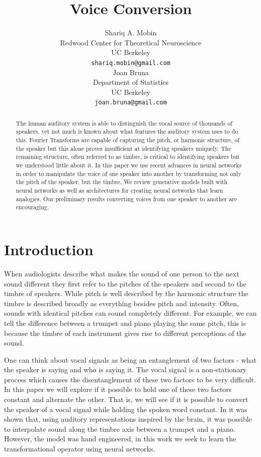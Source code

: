 \documentclass{article}
\title{Voice Conversion}
\author{
  Shariq A. Mobin \\
  Redwood Center for Theoretical Neuroscience \\
  UC Berkeley \\
  \texttt{shariq.mobin@gmail.com} \\
  \And
  Joan Bruna \\
  Department of Statistics \\
  UC Berkeley \\
  \texttt{joan.bruna@gmail.com}
}
\begin{document}

\maketitle

\begin{abstract}
    The human auditory system is able to distinguish the vocal source of thousands of speakers, yet not much is known about what features the auditory system uses to do this. Fourier Transforms are capable of capturing the pitch, or harmonic structure, of the speaker but this alone proves insufficient at identifying speakers uniquely. The remaining structure, often referred to as timbre, is critical to identifying speakers but we understood little about it. In this paper we use recent advances in neural networks in order to manipulate the voice of one speaker into another by transforming not only the pitch of the speaker, but the timbre. We review generative models built with neural networks as well as architectures for creating neural networks that learn analogies. Our preliminary results converting voices from one speaker to another are encouraging.
\end{abstract}

\section{Introduction}
    When audiologists describe what makes the sound of one person to the next sound different they first refer to the pitches of the speakers and second to the timbre of speakers. While pitch is well described by the harmonic structure the timbre is described broadly as everything besides pitch and intensity. Often, sounds with identical pitches can sound completely different. For example, we can tell the difference between a trumpet and piano playing the same pitch, this is because the timbre of each instrument gives rise to different perceptions of the sound.

    One can think about vocal signals as being an entanglement of two factors - what the speaker is saying and who is saying it. The vocal signal is a non-stationary process which causes the disentanglement of these two factors to be very difficult. In this paper we will explore if it possible to hold one of these two factors constant and alternate the other. That is, we will see if it is possible to convert the speaker of a vocal signal while holding the spoken word constant. In \cite{zotkin2003pitch} it was shown that, using auditory representations inspired by the brain, it was possible to interpolate sound along the timbre axis between a trumpet and a piano. However, the model was hand engineered, in this work we seek to learn the transformational operator using neural networks.
\end{document}
